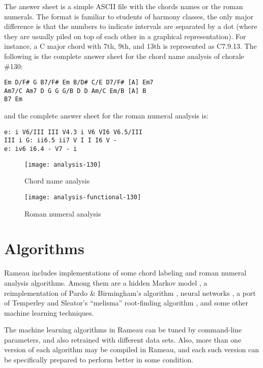 The answer sheet is a simple ASCII file with the chords names or the
roman numerals. The format is familiar to students of harmony classes,
the only major difference is that the numbers to indicate intervals
are separated by a dot (where they are usually piled on top of each
other in a graphical representation). For instance, a C major chord
with 7th, 9th, and 13th is represented as C7.9.13. The following is
the complete answer sheet for the chord name analysis of chorale
\#130:

\begin{verbatim}
Em D/F# G B7/F# Em B/D# C/E D7/F# [A] Em7
Am7/C Am7 D G G G/B D D Am/C Em/B [A] B 
B7 Em
\end{verbatim}

and the complete answer sheet for the roman numeral analysis is:

\begin{verbatim}
e: i V6/III III V4.3 i V6 VI6 V6.5/III
III i G: ii6.5 ii7 V I I I6 V -
e: iv6 i6.4 - V7 - i
\end{verbatim}

\begin{figure}
  \centering
  \texttt{[image: analysis-130]}
  \caption{Chord name analysis}
  \label{fig:chord-name-analysis}
\end{figure}
\begin{figure}
  \centering
  \texttt{[image: analysis-functional-130]}  
  \caption{Roman numeral analysis}
  \label{fig:roman-analysis}
\end{figure}

\section{Algorithms}
\label{sec:algorithms}

Rameau includes implementations of some chord labeling and roman
numeral analysis algorithms. Among them are a hidden Markov model
\cite{raphael.ea03:harmonic}, a reimplementation of Pardo \&
Birmingham's algorithm \cite{pardo.ea99:automated}, neural networks
\cite{tsui02:harmonic}, a port of Temperley and Sleator's ``melisma''
root-finding algorithm \cite{temperley.ea99:modeling}, and some other
machine learning techniques.

The machine learning algorithms in Rameau can be tuned by command-line
parameters, and also retrained with different data sets. Also, more
than one version of each algorithm may be compiled in Rameau, and each
such version can be specifically prepared to perform better in some
condition.

